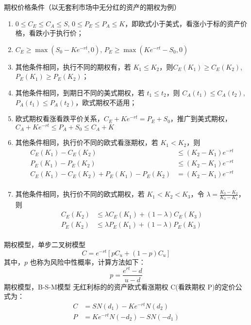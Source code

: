 \documentclass{article}
\begin{document}
期权价格条件（以无套利市场中无分红的资产的期权为例）
\begin{enumerate}
    \item $0\leq C_E\leq C_A \leq S$, $0\leq P_E\leq P_A \leq K$，即欧式小于美式，看涨小于标的资产价格，看跌小于执行价；
    \item $C_E\geq \max(S_0-Ke^{-rt}, 0)$, $P_E\geq \max(Ke^{-rt}-S_0, 0)$
    \item 其他条件相同，执行不同的期权有，若 $K_1\leq K_2$，则$C_E(K_1) \geq C_E(K_2)$, $P_E(K_1)\geq P_E(K_2)$；
    \item 其他条件相同，到期日不同的美式期权，若 $t_1\leq t_2$，则 $C_A(t_1)\leq C_A(t_2)$, $P_A(t_1)\leq P_A(t_2)$，欧式期权不适用；
    \item 欧式期权看涨看跌平价关系，$C_E+Ke^{-rt}=P_E+S_0$，推广到美式期权，$C_A+Ke^{-rt}\leq P_A+S_0\leq C_A+K$
    \item 其他条件相同，执行价不同的欧式看涨期权，若 $K_1<K_2$，则 
    \begin{equation}
        \begin{aligned}
            C_E(K_1)-C_E(K_2)&\leq (K_2-K_1)e^{-rt}\\
            P_E(K_1)-P_E(K_2)&\leq (K_2-K_1)e^{-rt}\\
            C_E(K_1)-C_E(K_2)+P_E(K_1)-P_E(K_2)&= (K_2-K_1)e^{-rt}\\
        \end{aligned}
    \end{equation}
    \item 其他条件相同，执行价不同的欧式期权，若 $K_1<K_2<K_3$，令 $\lambda=\frac{K_3-K_2}{K_3-K_1}$，则
    \begin{equation}
        \begin{aligned}
            C_E(K_2)&\leq \lambda C_E(K_1)+(1-\lambda)C_E(K_3)\\
            P_E(K_2)&\leq \lambda P_E(K_1)+(1-\lambda)P_E(K_3)\\
        \end{aligned}
    \end{equation}
\end{enumerate}
期权模型，单步二叉树模型
\begin{equation}
    C=e^{-rt}[pC_u+(1-p)C_u]
\end{equation}
其中，$p$ 也称为风险中性概率，计算方法如下：
$$p=\frac{e^{rt}-d}{u-d}$$
期权模型，B-S-M模型
无红利标的的资产欧式看涨期权 C(看跌期权 P)的定价公式为：
\begin{equation}
    \begin{aligned}
        C&=SN(d_1)-Ke^{-rt}N(d_2)\\
        P&=Ke^{-rt}N(-d_2)-SN(-d_1)\\
    \end{aligned}
\end{equation}
\end{document}
